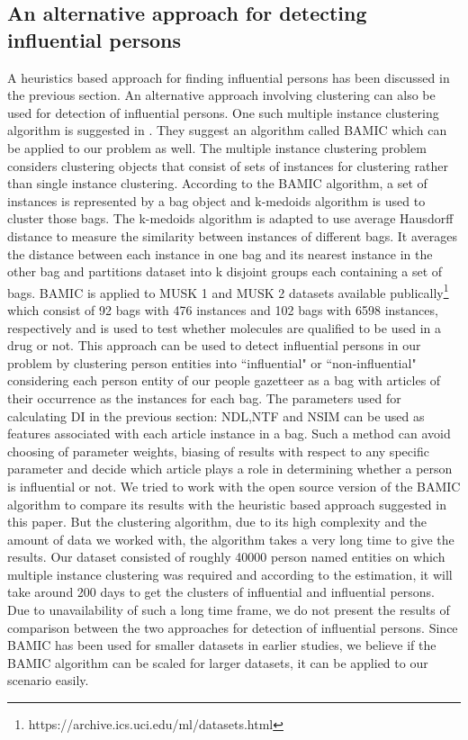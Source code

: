 \subsection{An alternative approach for detecting influential persons}
\label{influential:BAMIC}
A heuristics based approach for finding influential persons has been discussed in the previous section. An alternative approach involving clustering can also be used for detection of influential persons.
 One such multiple instance clustering algorithm is suggested in \cite{zhang2009multi}.  They suggest an algorithm called BAMIC which can be applied to our problem as well. The multiple instance clustering problem considers clustering objects that consist of sets of instances for clustering rather than single instance clustering. According to the BAMIC algorithm, a set of instances is represented by a bag object and k-medoids algorithm is used to cluster those bags. The k-medoids algorithm is adapted to use average Hausdorff distance to measure the similarity between instances of different bags. It averages the distance between each instance in one bag and its nearest instance in the other bag and partitions dataset into k disjoint groups each containing a set of bags. BAMIC is applied to MUSK 1 and MUSK 2 datasets available publically\footnote{https://archive.ics.uci.edu/ml/datasets.html} which consist of 92 bags with 476 instances and 102 bags with 6598 instances, respectively and is used to test whether molecules are qualified to be used in a drug or not.
 This approach can be used to detect influential persons in our problem by clustering person entities into ``influential" or ``non-influential"  considering each person entity of our people gazetteer as a bag with articles of their occurrence as the instances for each bag. 
The parameters used for calculating DI in the previous section: NDL,NTF and NSIM can be used as features associated with each article instance in a bag.
Such a method can avoid choosing of parameter weights, biasing of results with respect to any specific parameter and decide which article plays a role in determining whether a person is influential or not. 
We tried to work with the open source version of the BAMIC algorithm to compare its results with the heuristic based approach suggested in this paper. But the clustering algorithm, due to its high complexity and the amount of data we worked with, the algorithm takes a very long time to give the results. Our dataset consisted of roughly 40000 person named entities on which multiple instance clustering was required and according to the estimation, it will take around 200 days to get the clusters of influential and influential persons.  Due to unavailability of such a long time frame, we do not present the results of comparison between the two approaches for detection of influential persons. Since BAMIC has been used for smaller datasets in earlier studies, we believe if the BAMIC algorithm can be scaled for larger datasets, it can be applied to our scenario easily.
